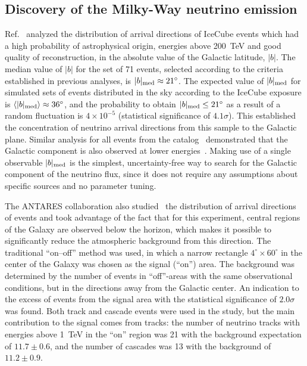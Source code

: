 \documentclass[a4paper,noshowpacs,noshowkeys,floatfix,twocolumn,preprintnumbers,nofootinbib]{revtex4-2}
\begin{document}
\subsection{Discovery of the Milky-Way neutrino emission}
\label{sec:gal:discovery}
Ref.~\cite{neutgalaxy} analyzed the distribution of arrival directions of IceCube events which had a high probability of astrophysical origin, energies above 200~TeV and good quality of reconstruction, in the absolute value of the Galactic latitude, $|b|$. The median value of $|b|$ for the set of 71 events, selected according to the criteria established in previous analyses, is $|b|_{\rm med}\approx 21^{\circ}$. The expected value of $|b|_{\rm med}$ for simulated sets of events distributed in the sky according to the IceCube exposure is $\langle |b|_{\rm med}\rangle \approx 36^{\circ}$, and the probability to obtain $|b|_{\rm med}\le 21^{\circ}$ as a result of a random fluctuation is $4\times 10^{-5}$ (statistical significance of $4.1\sigma$). This established the concentration of neutrino arrival directions from this sample to the Galactic plane. Similar analysis for all events from the catalog~\cite{IceCube10yrDataPaper} demonstrated that the Galactic component is also observed at lower energies~\cite{neutgalaxy}. Making use of a single observable $|b|_{\rm med}$ is the simplest, uncertainty-free way to search for the Galactic component of the neutrino flux, since it does not require any assumptions about specific sources and no parameter tuning.

The ANTARES collaboration also studied~\cite{ANTARES-ridge} the distribution of arrival directions of events and took advantage of the fact that for this experiment, central regions of the Galaxy are observed below the horizon, which makes it possible to significantly reduce the atmospheric background from this direction. The traditional ``on--off'' method was used, in which a narrow rectangle $4^{\circ}\times 60^{\circ}$ in the center of the Galaxy was chosen as the signal (``on'') area. The background was determined by the number of events in ``off''-areas with the same observational conditions, but in the directions away from the Galactic center. An indication to the excess of events from the signal area with the statistical significance of $2.0\sigma$ was found. Both track and cascade events were used in the study, but the main contribution to the signal comes from tracks: the number of neutrino tracks with energies above 1~TeV in the ``on'' region was 21 with the background expectation of $11.7 \pm 0.6$, and the number of cascades was 13 with the background of $11.2 \pm 0.9$.
\end{document}
